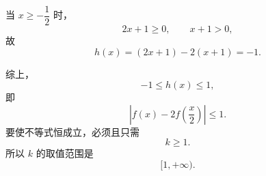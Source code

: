 \begin{answer}
当 $x\geqslant-\dfrac12$ 时，
\nopagebreak[4]
\[2x+1\geqslant0,\qquad x+1>0,\]
故
\nopagebreak[4]
\[h(x)=(2x+1)-2(x+1)=-1.\]

综上，
\nopagebreak[4]
\[-1\leqslant h(x)\leqslant1,\]
即
\nopagebreak[4]
\[\left|f(x)-2f\left(\frac x2\right)\right|\leqslant1.\]
要使不等式恒成立，必须且只需
\nopagebreak[4]
\[k\geqslant1.\]
所以 $k$ 的取值范围是
\nopagebreak[4]
\[[1,+\infty).\]


\gkanswer{答案（2）：$k\geqslant1$。令 $h(x)=|2x+1|-2|x+1|$，分段求得 $h(x)\in[-1,1]$，故 $k$ 的取值范围是 $[1,+\infty)$。}

\end{answer}